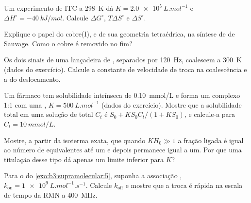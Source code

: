 \begin{exercise}[$\star\star$]\label{exo:b3:supramolecular:7}
Um experimento de ITC a \qty{298}{K} dá $K = \qty{2.0e5}{L.mol^{-1}}$ e $\Delta H^\circ = \qty{-40}{kJ/mol}$. Calcule $\Delta G^\circ$, $T\Delta S^\circ$ e
$\Delta S^\circ$.
\end{exercise}

\begin{exercise}[$\star\star$]\label{exo:b3:supramolecular:8}
Explique o papel do cobre(I), e de sua geometria tetraédrica, na síntese de  de
Sauvage. Como o cobre é removido no fim?
\end{exercise}

\begin{exercise}[$\star\star$]\label{exo:b3:supramolecular:9}
Os dois sinais de uma lançadeira de , separados por \qty{120}{Hz}, coalescem a \qty{300}{K} (dados do
exercício). Calcule a constante de velocidade de troca na coalescência e a  do deslocamento.
\end{exercise}

\begin{exercise}[$\star\star\star$]\label{exo:b3:supramolecular:10}
Um fármaco tem solubilidade intrínseca de \qty{0.10}{mmol/L} e forma um complexo 1:1 com uma
, $K = \qty{500}{L.mol^{-1}}$ (dados do exercício). Mostre que a solubilidade total em uma
solução de  total $C_t$ é $S_0 + KS_0C_t/(1 + KS_0)$, e calcule-a para $C_t = \qty{10}{mmol/L}$.
\end{exercise}

\begin{exercise}[$\star\star\star$]\label{exo:b3:supramolecular:11}
Mostre, a partir da isoterma exata, que quando $KH_0 \gg 1$ a fração ligada é igual ao
número de equivalentes até um e depois permanece igual a um. Por que uma titulação desse tipo
dá apenas um limite inferior para $K$?
\end{exercise}

\begin{exercise}[$\star\star\star$]\label{exo:b3:supramolecular:12}
Para o  do \cref{exo:b3:supramolecular:5}, suponha a associação
, $k_{\mathrm{on}} = \qty{1e9}{L.mol^{-1}.s^{-1}}$. Calcule $k_{\mathrm{off}}$ e mostre que a troca é rápida na
escala de tempo da RMN a \qty{400}{MHz}.
\end{exercise}

